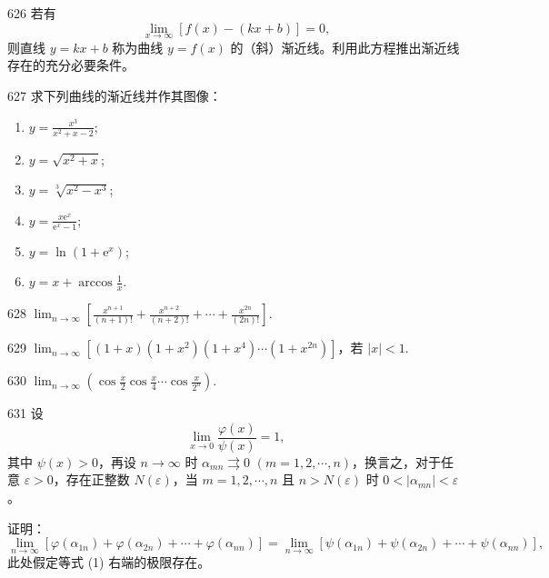 \begin{prob}[M]{626}
若有
\[
\lim_{x \to \infty} [f(x) - (kx + b)] = 0,
\]
则直线 $y = kx + b$ 称为曲线 $y = f(x)$ 的（斜）渐近线。利用此方程推出渐近线存在的充分必要条件。
\end{prob}

\begin{prob}[L]{627}
求下列曲线的渐近线并作其图像：
\begin{enumerate}[label=(\alph*), itemsep=2pt, topsep=3pt]
\item $y = \frac{x^3}{x^2 + x - 2}$;
\item $y = \sqrt{x^2 + x}$;
\item $y = \sqrt[3]{x^2 - x^3}$;
\item $y = \frac{x\mathrm{e}^x}{\mathrm{e}^x - 1}$;
\item $y = \ln(1 + \mathrm{e}^x)$;
\item $y = x + \arccos\frac{1}{x}$.
\end{enumerate}
\end{prob}


\begin{prob}[M]{628}
$\lim_{n \to \infty} \left[\frac{x^{n+1}}{(n+1)!} + \frac{x^{n+2}}{(n+2)!} + \cdots + \frac{x^{2n}}{(2n)!}\right]$.
\end{prob}

\begin{prob}[M]{629}
$\lim_{n \to \infty} [(1+x)(1+x^2)(1+x^4)\cdots(1+x^{2n})]$，若 $|x| < 1$.
\end{prob}

\begin{prob}[M]{630}
$\lim_{n \to \infty} \left(\cos\frac{x}{2}\cos\frac{x}{4}\cdots\cos\frac{x}{2^n}\right)$.
\end{prob}

\begin{prob}[L]{631}
设
\[
\lim_{x \to 0} \frac{\varphi(x)}{\psi(x)} = 1,
\]
其中 $\psi(x) > 0$，再设 $n \to \infty$ 时 $\alpha_{mn} \rightrightarrows 0$ $(m = 1, 2, \cdots, n)$，换言之，对于任意 $\varepsilon > 0$，存在正整数 $N(\varepsilon)$，当 $m = 1, 2, \cdots, n$ 且 $n > N(\varepsilon)$ 时 $0 < |\alpha_{mn}| < \varepsilon$。

证明：
\[
\lim_{n \to \infty} [\varphi(\alpha_{1n}) + \varphi(\alpha_{2n}) + \cdots + \varphi(\alpha_{nn})] = \lim_{n \to \infty} [\psi(\alpha_{1n}) + \psi(\alpha_{2n}) + \cdots + \psi(\alpha_{nn})], \tag{1}
\]
此处假定等式 (1) 右端的极限存在。
\end{prob}

